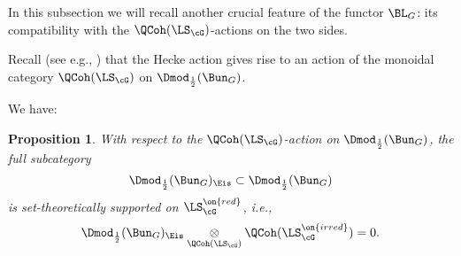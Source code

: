 \documentclass[9pt]{amsart}
\newtheorem{prop}[subsubsection]{Proposition}
\theoremstyle{remark}
\theoremstyle{definition}
\theoremstyle{remark}
\newcommand{\propref}[1]{Proposition~\ref{#1}}
\numberwithin{equation}{section}
\begin{document}
%
%
%
%
%
%
%


In this subsection we will recall another crucial feature of the functor $\BL_G$: its
compatibility with the $\QCoh(\LS_\cG)$-actions on the two sides. 

\sssec{}

Recall (see e.g., \cite[Theorem 1.2.4]{GLC1}) that the Hecke action gives rise to an action of the monoidal
category $\QCoh(\LS_\cG)$ on $\Dmod_{\frac{1}{2}}(\Bun_G)$.

\sssec{}

We have: 

\begin{prop} \label{p:Eis is red}
With respect to the $\QCoh(\LS_\cG)$-action on $\Dmod_{\frac{1}{2}}(\Bun_G)$, the full subcategory 
$$\Dmod_{\frac{1}{2}}(\Bun_G)_{\Eis}\subset \Dmod_{\frac{1}{2}}(\Bun_G)$$
is set-theoretically supported on $\LS_\cG^{\on{red}}$, i.e.,
\begin{equation} \label{e:Eis is red}
\Dmod_{\frac{1}{2}}(\Bun_G)_{\Eis}\underset{\QCoh(\LS_\cG)}\otimes \QCoh(\LS^{\on{irred}}_\cG)=0.
\end{equation} 
\end{prop}
\end{document}
